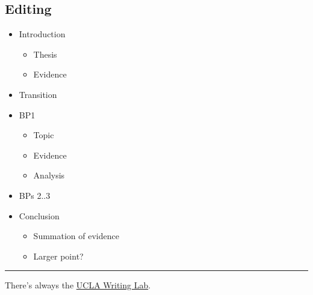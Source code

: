\documentclass[letterpaper]{article}
\begin{document}
\subsection{Editing}
\label{sec:org947bbf4}
\begin{itemize}
\item Introduction
\begin{itemize}
\item Thesis
\item Evidence
\end{itemize}
\item Transition
\item BP1
\begin{itemize}
\item Topic
\item Evidence
\item Analysis
\end{itemize}
\item BPs 2..3
\item Conclusion
\begin{itemize}
\item Summation of evidence
\item Larger point?
\end{itemize}
\end{itemize}


\noindent\rule{\textwidth}{0.5pt}

There's always the \href{https://wp.ucla.edu/wp-content/uploads/2016/01/UWC\_handouts\_What-How-So-What-Thesis-revised-5-4-15-RZ.pdf}{UCLA Writing Lab}.
\end{document}
